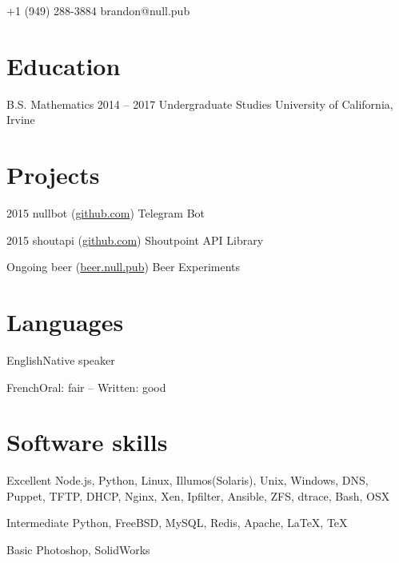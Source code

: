 \documentclass{tccv}
\begin{document}
    {+1 (949) 288-3884}
    {brandon@null.pub}

\section{Education}

\begin{yearlist}

\item[B.S. Mathematics]{2014 -- 2017}
     {Undergraduate Studies}
     {University of California, Irvine}

\end{yearlist}

\section{Projects}

\begin{yearlist}

\item{2015}
     {nullbot (\href{https://github.com/baetheus/nullbot}{github.com})}
     {Telegram Bot}

\item{2015}
     {shoutapi (\href{https://github.com/baetheus/shoutapi}{github.com})}
     {Shoutpoint API Library}

\item{Ongoing}
     {beer (\href{https://beer.null.pub}{beer.null.pub})}
     {Beer Experiments}

\end{yearlist}

\section{Languages}

\begin{factlist}
\item{English}{Native speaker}
\item{French}{Oral: fair -- Written: good}
\end{factlist}

\section{Software skills}

\begin{factlist}

\item{Excellent}
     {Node.js, Python, Linux, Illumos(Solaris), Unix, Windows, DNS,
     Puppet, TFTP, DHCP, Nginx, Xen, Ipfilter, Ansible, ZFS, dtrace,
     Bash, OSX}

\item{Intermediate}
     {Python, FreeBSD, MySQL, Redis, Apache, \LaTeX, \TeX}

\item{Basic}
     {Photoshop, SolidWorks}

\end{factlist}
\end{document}
